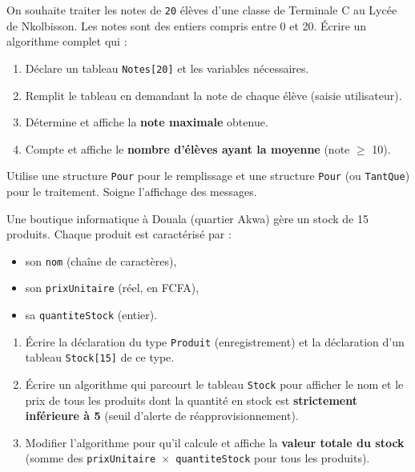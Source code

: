 \documentclass[11pt]{article}
\newcounter{popsec}
\newcounter{popsub}
\newcommand{\courssub}[1]{%
  \stepcounter{popsub}%
  \par\vspace{9pt}\noindent{\popxbold\fontsize{11.5}{13}\selectfont\color{popink}{\color{poporange}\thepopsec.\thepopsub}\hspace{6pt}#1}\par\nopagebreak\vspace{4pt}
}
\begin{document}
\courssub{Je m'entraîne}

\begin{exercice}
On souhaite traiter les notes de \texttt{20} élèves d'une classe de Terminale C au Lycée de Nkolbisson. Les notes sont des entiers compris entre 0 et 20.
Écrire un algorithme complet qui :
\begin{enumerate}
    \item Déclare un tableau \texttt{Notes[20]} et les variables nécessaires.
    \item Remplit le tableau en demandant la note de chaque élève (saisie utilisateur).
    \item Détermine et affiche la \textbf{note maximale} obtenue.
    \item Compte et affiche le \textbf{nombre d'élèves ayant la moyenne} (note $\ge$ 10).
\end{enumerate}
Utilise une structure \texttt{Pour} pour le remplissage et une structure \texttt{Pour} (ou \texttt{TantQue}) pour le traitement. Soigne l'affichage des messages.
\end{exercice}

\begin{exercice}
Une boutique informatique à Douala (quartier Akwa) gère un stock de 15 produits. Chaque produit est caractérisé par :
\begin{itemize}
    \item son \texttt{nom} (chaîne de caractères),
    \item son \texttt{prixUnitaire} (réel, en FCFA),
    \item sa \texttt{quantiteStock} (entier).
\end{itemize}
\begin{enumerate}
    \item Écrire la déclaration du type \texttt{Produit} (enregistrement) et la déclaration d'un tableau \texttt{Stock[15]} de ce type.
    \item Écrire un algorithme qui parcourt le tableau \texttt{Stock} pour afficher le nom et le prix de tous les produits dont la quantité en stock est \textbf{strictement inférieure à 5} (seuil d'alerte de réapprovisionnement).
    \item Modifier l'algorithme pour qu'il calcule et affiche la \textbf{valeur totale du stock} (somme des \texttt{prixUnitaire $\times$ quantiteStock} pour tous les produits).
\end{enumerate}
\end{exercice}
\end{document}
